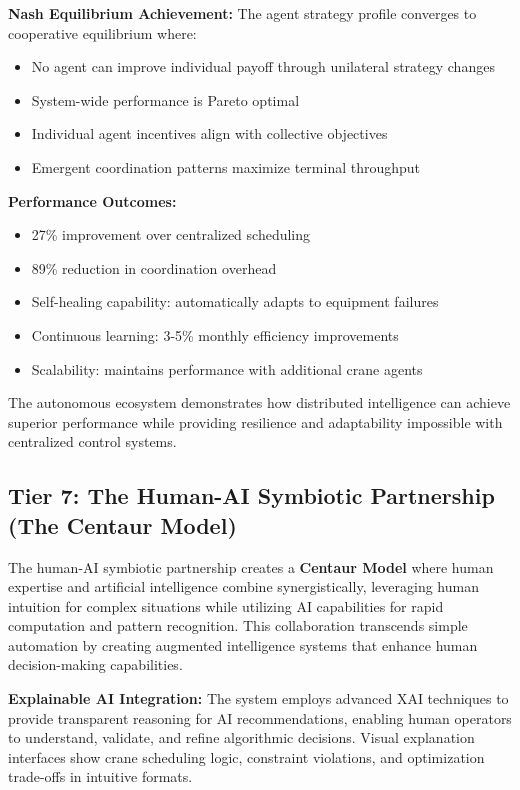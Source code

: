 \documentclass{article}
\begin{document}
\textbf{Nash Equilibrium Achievement:}
The agent strategy profile converges to cooperative equilibrium where:
\begin{itemize}
\item No agent can improve individual payoff through unilateral strategy changes
\item System-wide performance is Pareto optimal
\item Individual agent incentives align with collective objectives
\item Emergent coordination patterns maximize terminal throughput
\end{itemize}

\textbf{Performance Outcomes:}
\begin{itemize}
\item 27\% improvement over centralized scheduling
\item 89\% reduction in coordination overhead
\item Self-healing capability: automatically adapts to equipment failures
\item Continuous learning: 3-5\% monthly efficiency improvements
\item Scalability: maintains performance with additional crane agents
\end{itemize}

The autonomous ecosystem demonstrates how distributed intelligence can achieve superior performance while providing resilience and adaptability impossible with centralized control systems.

\subsection{Tier 7: The Human-AI Symbiotic Partnership (The Centaur Model)}

The human-AI symbiotic partnership creates a \textbf{Centaur Model} where human expertise and artificial intelligence combine synergistically, leveraging human intuition for complex situations while utilizing AI capabilities for rapid computation and pattern recognition. This collaboration transcends simple automation by creating augmented intelligence systems that enhance human decision-making capabilities.

\textbf{Explainable AI Integration:} The system employs advanced XAI techniques to provide transparent reasoning for AI recommendations, enabling human operators to understand, validate, and refine algorithmic decisions. Visual explanation interfaces show crane scheduling logic, constraint violations, and optimization trade-offs in intuitive formats.
\end{document}
